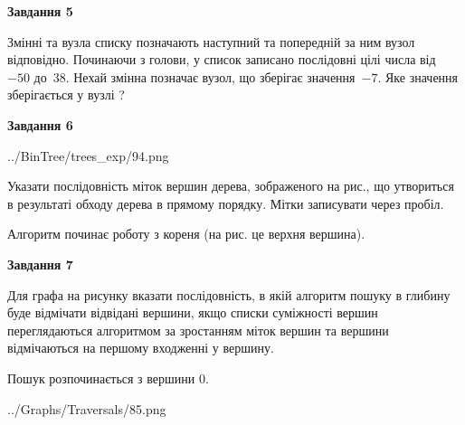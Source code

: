 \documentclass[12pt, ukrainian]{article}
\begin{document}
{\begin {large}
{\begin {center}\textbf{Завдання 5}\end {center}}\par
Змінні  та  вузла списку позначають наступний та попередній за ним вузол відповідно. Починаючи з голови, у список записано послідовні цілі числа від~$-50$ до~$38$. Нехай змінна  позначає вузол, що зберігає значення~$-7$.
Яке значення зберігається у вузлі  ?\par
\newpage

{\begin {center}\textbf{Завдання 6}\end {center}}\par

\begin{center}
	{../BinTree/trees_exp/94.png}
\end{center}
Указати послідовність міток вершин дерева, зображеного на рис., що утвориться в результаті обходу дерева в прямому порядку. Мітки записувати через пробіл.\par Алгоритм починає роботу з кореня (на рис. це верхня вершина).\par
\newpage

{\begin {center}\textbf{Завдання 7}\end {center}}\par
Для графа на рисунку вказати послідовність, в якій алгоритм пошуку в глибину буде відмічати відвідані вершини, якщо списки суміжності вершин переглядаються алгоритмом за зростанням міток вершин та вершини відмічаються на першому вход\-женні у вершину.\par
Пошук розпочинається з вершини 0.\par

\begin{center}
	{../Graphs/Traversals/85.png}
\end{center}\par
\newpage


\end{large}}
\end{document}
